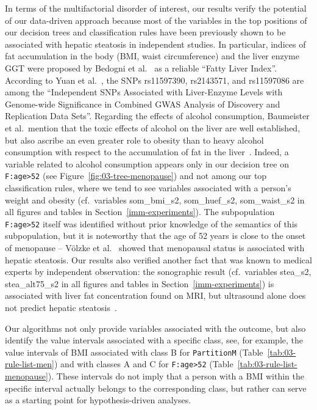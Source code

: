 \documentclass[
  oneside]{book}
\begin{document}
In terms of the multifactorial disorder of interest, our results verify the potential of our data-driven approach because most of the variables in the top positions of our decision trees and classification rules have been previously shown to be associated with hepatic steatosis in independent studies.
In particular, indices of fat accumulation in the body (BMI, waist circumference) and the liver enzyme GGT were proposed by Bedogni et al.~\autocite{BedogniEtAl:2006} as a reliable ``Fatty Liver Index''.
According to Yuan et al.~\autocite{YuanEtAl2008}, the SNPs rs11597390, rs2143571, and rs11597086 are among the ``Independent SNPs Associated with Liver-Enzyme Levels with Genome-wide Significance in Combined GWAS Analysis of Discovery and Replication Data Sets''.
Regarding the effects of alcohol consumption, Baumeister et al.~mention that the toxic effects of alcohol on the liver are well established, but also ascribe an even greater role to obesity than to heavy alcohol consumption with respect to the accumulation of fat in the liver~\autocite{BaumeisterEtAl:2008,BellentaniEtAl:InternMed2000}.
Indeed, a variable related to alcohol consumption appears only in our decision tree on \texttt{F:age\textgreater{}52} (see Figure~\ref{fig:03-tree-menopause}) and not among our top classification rules, where we tend to see variables associated with a person's weight and obesity (cf.~variables som\_bmi\_s2, som\_huef\_s2, som\_waist\_s2 in all figures and tables in Section~\ref{imm-experiments}).
The subpopulation \texttt{F:age\textgreater{}52} itself was identified without prior knowledge of the semantics of this subpopulation, but it is noteworthy that the age of 52 years is close to the onset of menopause -- Völzke et al.~\autocite{VoelzkeEtAl:Gut2007} showed that menopausal status is associated with hepatic steatosis.
Our results also verified another fact that was known to medical experts by independent observation: the sonographic result (cf.~variables stea\_s2, stea\_alt75\_s2 in all figures and tables in Section~\ref{imm-experiments}) is associated with liver fat concentration found on MRI, but ultrasound alone does not predict hepatic steatosis~\autocite{BellentaniEtAl:InternMed2000,BedogniEtAl:2006}.

Our algorithms not only provide variables associated with the outcome, but also identify the value intervals associated with a specific class, see, for example, the value intervals of BMI associated with class B for \texttt{PartitionM} (Table~\ref{tab:03-rule-list-men}) and with classes A and C for \texttt{F:age\textgreater{}52} (Table~\ref{tab:03-rule-list-menopause}).
These intervals do not imply that a person with a BMI within the specific interval actually belongs to the corresponding class, but rather can serve as a starting point for hypothesis-driven analyses.
\end{document}
